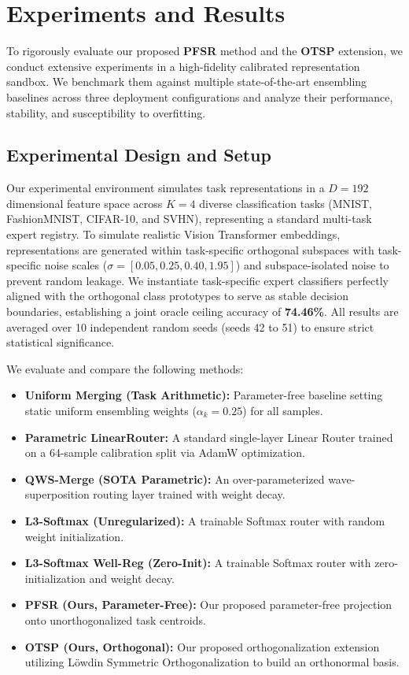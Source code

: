 \section{Experiments and Results}
\label{sec:experiments}

To rigorously evaluate our proposed \textbf{PFSR} method and the \textbf{OTSP} extension, we conduct extensive experiments in a high-fidelity calibrated representation sandbox. We benchmark them against multiple state-of-the-art ensembling baselines across three deployment configurations and analyze their performance, stability, and susceptibility to overfitting.

\subsection{Experimental Design and Setup}
Our experimental environment simulates task representations in a $D=192$ dimensional feature space across $K=4$ diverse classification tasks (MNIST, FashionMNIST, CIFAR-10, and SVHN), representing a standard multi-task expert registry. To simulate realistic Vision Transformer embeddings, representations are generated within task-specific orthogonal subspaces with task-specific noise scales ($\sigma = [0.05, 0.25, 0.40, 1.95]$) and subspace-isolated noise to prevent random leakage. We instantiate task-specific expert classifiers perfectly aligned with the orthogonal class prototypes to serve as stable decision boundaries, establishing a joint oracle ceiling accuracy of \textbf{74.46\%}. All results are averaged over 10 independent random seeds (seeds 42 to 51) to ensure strict statistical significance.

We evaluate and compare the following methods:
\begin{itemize}
    \item \textbf{Uniform Merging (Task Arithmetic):} Parameter-free baseline setting static uniform ensembling weights ($\alpha_k = 0.25$) for all samples.
    \item \textbf{Parametric LinearRouter:} A standard single-layer Linear Router trained on a 64-sample calibration split via AdamW optimization.
    \item \textbf{QWS-Merge (SOTA Parametric):} An over-parameterized wave-superposition routing layer trained with weight decay.
    \item \textbf{L3-Softmax (Unregularized):} A trainable Softmax router with random weight initialization.
    \item \textbf{L3-Softmax Well-Reg (Zero-Init):} A trainable Softmax router with zero-initialization and weight decay.
    \item \textbf{PFSR (Ours, Parameter-Free):} Our proposed parameter-free projection onto unorthogonalized task centroids.
    \item \textbf{OTSP (Ours, Orthogonal):} Our proposed orthogonalization extension utilizing L{\"o}wdin Symmetric Orthogonalization to build an orthonormal basis.
\end{itemize}

